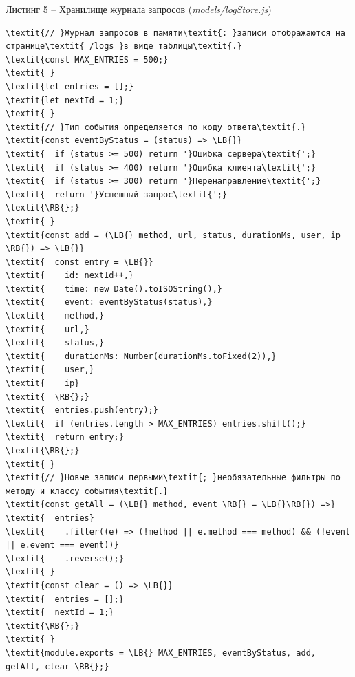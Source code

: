 \documentclass[14pt,a4paper]{extarticle}
\newcommand{\LB}{\char123}
\newcommand{\RB}{\char125}
\begin{document}
\noindent\vspace{18pt}\par\nopagebreak\noindent Листинг 5 – Хранилище журнала запросов (\textit{models/logStore.js})\par\nopagebreak
\begin{Verbatim}[commandchars=\\\{\},fontsize=\small,baselinestretch=1]
\textit{// }Журнал запросов в памяти\textit{: }записи отображаются на странице\textit{ /logs }в виде таблицы\textit{.}
\textit{const MAX_ENTRIES = 500;}
\textit{ }
\textit{let entries = [];}
\textit{let nextId = 1;}
\textit{ }
\textit{// }Тип события определяется по коду ответа\textit{.}
\textit{const eventByStatus = (status) => \LB{}}
\textit{  if (status >= 500) return '}Ошибка сервера\textit{';}
\textit{  if (status >= 400) return '}Ошибка клиента\textit{';}
\textit{  if (status >= 300) return '}Перенаправление\textit{';}
\textit{  return '}Успешный запрос\textit{';}
\textit{\RB{};}
\textit{ }
\textit{const add = (\LB{} method, url, status, durationMs, user, ip \RB{}) => \LB{}}
\textit{  const entry = \LB{}}
\textit{    id: nextId++,}
\textit{    time: new Date().toISOString(),}
\textit{    event: eventByStatus(status),}
\textit{    method,}
\textit{    url,}
\textit{    status,}
\textit{    durationMs: Number(durationMs.toFixed(2)),}
\textit{    user,}
\textit{    ip}
\textit{  \RB{};}
\textit{  entries.push(entry);}
\textit{  if (entries.length > MAX_ENTRIES) entries.shift();}
\textit{  return entry;}
\textit{\RB{};}
\textit{ }
\textit{// }Новые записи первыми\textit{; }необязательные фильтры по методу и классу события\textit{.}
\textit{const getAll = (\LB{} method, event \RB{} = \LB{}\RB{}) =>}
\textit{  entries}
\textit{    .filter((e) => (!method || e.method === method) && (!event || e.event === event))}
\textit{    .reverse();}
\textit{ }
\textit{const clear = () => \LB{}}
\textit{  entries = [];}
\textit{  nextId = 1;}
\textit{\RB{};}
\textit{ }
\textit{module.exports = \LB{} MAX_ENTRIES, eventByStatus, add, getAll, clear \RB{};}
\end{Verbatim}
\vspace{18pt}
\end{document}
